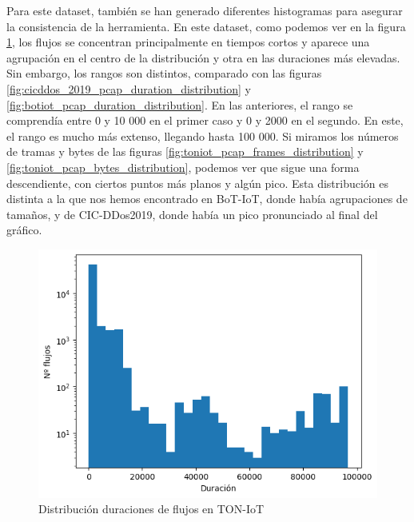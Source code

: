 Para este dataset, también se han generado diferentes histogramas para asegurar la consistencia de la herramienta. En este dataset, como podemos ver en la figura \ref{fig:toniot_pcap_duration_distribution}, los flujos se concentran principalmente en tiempos cortos y aparece una agrupación en el centro de la distribución y otra en las duraciones más elevadas. Sin embargo, los rangos son distintos, comparado con las figuras \ref{fig:cicddos_2019_pcap_duration_distribution} y \ref{fig:botiot_pcap_duration_distribution}. En las anteriores, el rango se comprendía entre 0 y 10 000 en el primer caso y 0 y 2000 en el segundo. En este, el rango es mucho más extenso, llegando hasta 100 000. Si miramos los números de tramas y bytes de las figuras \ref{fig:toniot_pcap_frames_distribution} y \ref{fig:toniot_pcap_bytes_distribution}, podemos ver que sigue una forma descendiente, con ciertos puntos más planos y algún pico. Esta distribución es distinta a la que nos hemos encontrado en BoT-IoT, donde había agrupaciones de tamaños, y de CIC-DDos2019, donde había un pico pronunciado al final del gráfico.

\begin{figure}[H]
  \begin{center}
      \includegraphics[width=0.49\linewidth]{media/toniot_pcap_duration_distribution.png}
  \end{center}
  \captionsetup{justification=centering}
  \caption{Distribución duraciones de flujos en TON-IoT}\label{fig:toniot_pcap_duration_distribution}
\end{figure}

